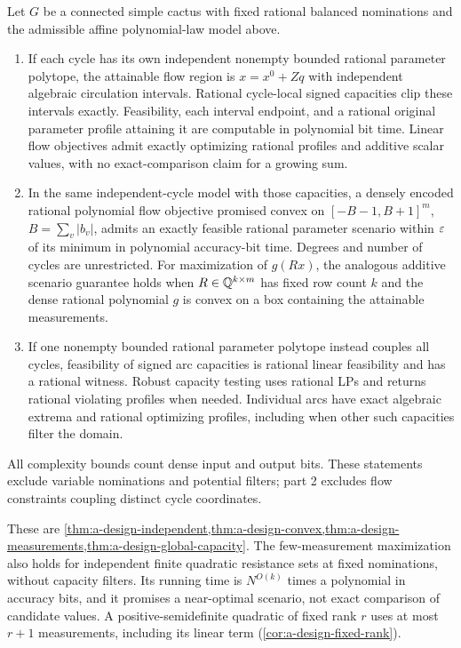 \begin{theorem}
\label{thm:main-design}
Let $G$ be a connected simple cactus with fixed rational balanced
nominations and the admissible affine polynomial-law model above.
\begin{enumerate}
\item If each cycle has its own independent nonempty bounded rational
parameter polytope, the attainable flow region is
$x=x^0+Zq$ with independent algebraic circulation intervals.
Rational cycle-local signed capacities clip these intervals exactly.
Feasibility, each interval endpoint, and a rational original parameter
profile attaining it are computable in polynomial bit time. Linear
flow objectives admit exactly optimizing rational profiles and additive
scalar values, with no exact-comparison claim for a growing sum.
\item In the same independent-cycle model with those capacities, a
densely encoded rational polynomial flow objective promised convex on
$[-B-1,B+1]^m$, $B=\sum_v|b_v|$, admits an exactly feasible rational
parameter scenario within $\varepsilon$ of its minimum in polynomial
accuracy-bit time. Degrees and number of cycles are unrestricted.
For maximization of $g(Rx)$, the analogous additive scenario guarantee
holds when $R\in\mathbb{Q}^{k\times m}$ has fixed row count $k$ and the dense
rational polynomial $g$ is convex on a box containing the attainable
measurements.
\item If one nonempty bounded rational parameter polytope instead
couples all cycles, feasibility of signed arc capacities is rational
linear feasibility and has a rational witness. Robust capacity testing
uses rational LPs and returns rational violating profiles when needed.
Individual arcs have exact algebraic extrema and rational optimizing
profiles, including when other such capacities filter the domain.
\end{enumerate}
All complexity bounds count dense input and output bits. These statements
exclude variable nominations and potential filters; part 2 excludes
flow constraints coupling distinct cycle coordinates.
\end{theorem}

These are \cref{thm:a-design-independent,thm:a-design-convex,thm:a-design-measurements,thm:a-design-global-capacity}.
The few-measurement maximization also holds for independent finite
quadratic resistance sets at fixed nominations, without capacity
filters. Its running time is $N^{O(k)}$ times a polynomial in accuracy
bits, and it promises a near-optimal scenario, not exact comparison of
candidate values. A positive-semidefinite quadratic of fixed rank $r$
uses at most $r+1$ measurements, including its linear term
(\cref{cor:a-design-fixed-rank}).


